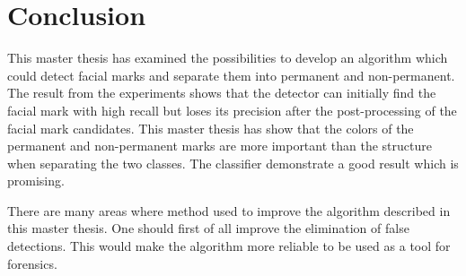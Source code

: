 \chapter{Conclusion}\label{cha:conclusion}

This master thesis has examined the possibilities to develop an algorithm which could detect facial marks and separate them into permanent and non-permanent. The result from the experiments shows that the detector can initially find the facial mark with high recall but loses its precision after the post-processing of the facial mark candidates. This master thesis has show that the colors of the permanent and non-permanent marks are more important than the structure when separating the two classes. The classifier demonstrate a good result which is promising.   

There are many areas where method used to improve the algorithm described in this master thesis. One should first of all improve the elimination of false detections. This would make the algorithm more reliable to be used as a tool for forensics.  

